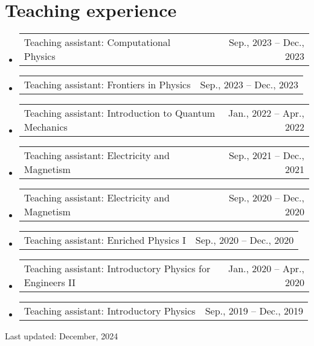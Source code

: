 \documentclass[letterpaper,11pt]{article}
\makeatletter
\newcommand{\TeachingItem}[2]{
	\item{\vspace{-1pt}
		\begin{tabular*}{0.92\textwidth}{l@{\extracolsep{\fill}}r}
			{#1} & {#2}
		\end{tabular*}
		\vspace{-5pt}
	}
}
\makeatother
\begin{document}
\section*{Teaching experience}
\begin{itemize}[leftmargin=*]
	\TeachingItem{Teaching assistant: Computational Physics}{Sep., 2023 -- Dec., 2023}
	\TeachingItem{Teaching assistant: Frontiers in Physics}{Sep., 2023 -- Dec., 2023}
	\TeachingItem{Teaching assistant: Introduction to Quantum Mechanics}{Jan., 2022 -- Apr., 2022}
	\TeachingItem{Teaching assistant: Electricity and Magnetism}{Sep., 2021 -- Dec., 2021}
	\TeachingItem{Teaching assistant: Electricity and Magnetism}{Sep., 2020 -- Dec., 2020}
	\TeachingItem{Teaching assistant: Enriched Physics I}{Sep., 2020 -- Dec., 2020}
	\TeachingItem{Teaching assistant: Introductory Physics for Engineers II}{Jan., 2020 -- Apr., 2020}
	\TeachingItem{Teaching assistant: Introductory Physics}{Sep., 2019 -- Dec., 2019}
\end{itemize}

\vspace{1cm}

\begin{flushright}
	Last updated: December, 2024
\end{flushright}
\end{document}
